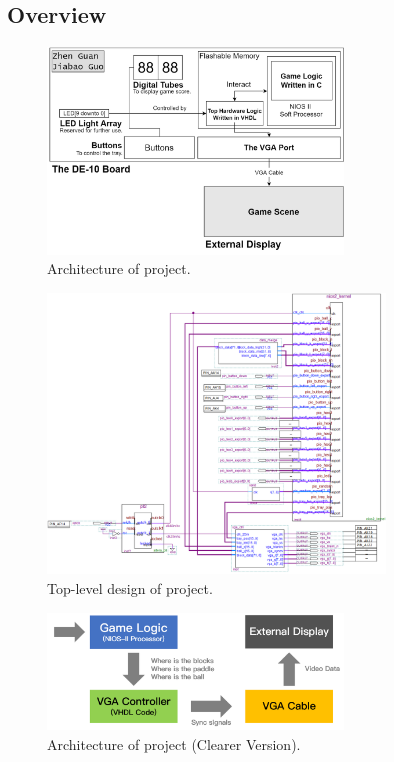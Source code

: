 \documentclass[conference]{IEEEtran}
\begin{document}
\subsection{Overview}

\begin{figure}[htbp] %
    \centering
    \includegraphics[width=0.7\textwidth]{imageset/diag_1.drawio} %
    \caption{Architecture of project.}
    \label{fig0}
\end{figure}

\begin{figure}[htbp] %
    \centering
    \includegraphics[width=0.8\textwidth]{imageset/top_level} %
    \caption{Top-level design of project.}
    \label{fig_top_level}
\end{figure}

\begin{figure}[htbp] %
    \centering
    \includegraphics[width=0.7\textwidth]{imageset/arch_clear} %
    \caption{Architecture of project (Clearer Version).}
    \label{fig1}
\end{figure}
\end{document}
